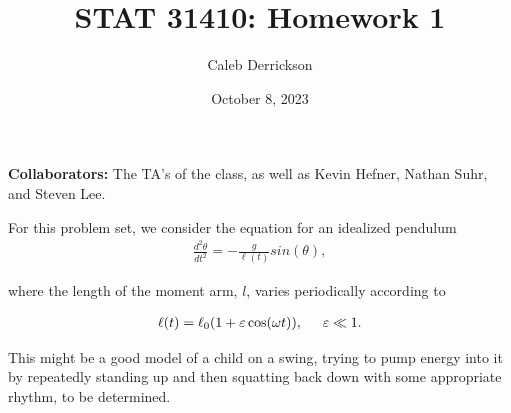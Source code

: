 \documentclass[12pt]{article}
\title{STAT 31410: Homework 1}
\author{Caleb Derrickson}
\date{October 8, 2023}
\newcommand{\jump}{\vspace{5mm}}
\newcommand{\ep}{\varepsilon}
\begin{document}
\onehalfspacing
\maketitle

{\color{cit}\vspace{2mm}\noindent\textbf{Collaborators:}} The TA's of the class, as well as Kevin Hefner, Nathan Suhr, and Steven Lee.

\jump
For this problem set, we consider the equation for an idealized pendulum
\begin{align}
    \frac{d^2\theta}{dt^2} = -\frac{g}{\ell(t)}sin(\theta), \label{Original ode}
\end{align}

where the length of the moment arm, $l$, varies periodically according to

\begin{align}
    \ell (t) = \ell_0(1 + \ep \cos(\omega t)), \hspace{5mm} \ep \ll 1.    \label{length approx}
\end{align}

This might be a good model of a child on a swing, trying to pump energy into it by repeatedly
standing up and then squatting back down with some appropriate rhythm, to be determined.

\jump
\centerline{\noindent}%
\jump
\end{document}
